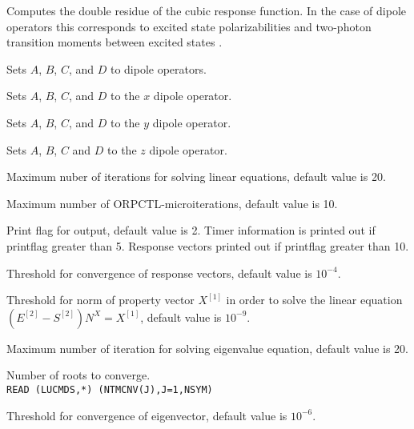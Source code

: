 \begin{description}
\item{}
Computes the double residue of the cubic
response function.
In the case of dipole operators this corresponds to excited
state polarizabilities and two-photon transition
moments 
between excited states \cite{djpnylhajcp105}.

\item{}
Sets $A$, $B$, $C$, and $D$ to dipole operators.

\item{}
Sets $A$, $B$, $C$, and $D$ to the $x$ dipole operator.

\item{}
Sets $A$, $B$, $C$, and $D$ to the $y$ dipole operator.

\item{}
Sets $A$, $B$, $C$ and $D$ to the $z$ dipole operator.

\item{}
Maximum nuber of iterations for solving linear equations, default value is 20.

\item{}
Maximum number of ORPCTL-microiterations, default value is 10.

\item{}
Print flag for output, default value is 2. Timer information is printed
out if printflag greater than 5. Response vectors printed out if
printflag greater than 10.

\item{}
Threshold for convergence of response vectors, default value is $10^{-4}$.

\item{}
Threshold for norm of property vector $X^{[1]}$ in order to solve the linear
equation \\
$\left( E^{[2]} - S^{[2]} \right)N^{X} = X^{[1]}$, default
value is $10^{-9}$. 

\item{}
Maximum number of iteration for solving eigenvalue equation, default
value is 20.

\item{}
Number of roots to converge. \\
\verb|READ (LUCMDS,*) (NTMCNV(J),J=1,NSYM)|\\

\item{}
Threshold for convergence of eigenvector, default value is $10^{-6}$.

\end{description}

